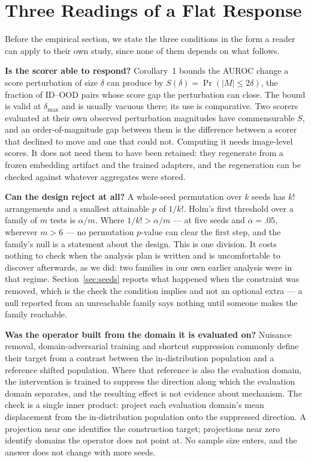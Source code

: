 \documentclass[11pt,a4paper]{article}
\begin{document}
\section{Three Readings of a Flat Response}
\label{sec:three}
Before the empirical section, we state the three conditions in the form a
reader can apply to their own study, since none of them depends on what
follows.

\textbf{Is the scorer able to respond?} Corollary~1 bounds the AUROC change a
score perturbation of size $\delta$ can produce by $S(\delta)=\Pr(|M|\le
2\delta)$, the fraction of ID--OOD pairs whose score gap the perturbation can
close. The bound is valid at $\delta_{\max}$ and is usually vacuous there; its
use is comparative. Two scorers evaluated at their own observed perturbation
magnitudes have commensurable $S$, and an order-of-magnitude gap between them
is the difference between a scorer that declined to move and one that could not.
Computing it needs image-level scores. It does not need them to have been
retained: they regenerate from a frozen embedding artifact and the trained
adapters, and the regeneration can be checked against whatever aggregates were
stored.

\textbf{Can the design reject at all?} A whole-seed permutation over $k$ seeds
has $k!$ arrangements and a smallest attainable $p$ of $1/k!$. Holm's first
threshold over a family of $m$ tests is $\alpha/m$. Where $1/k! > \alpha/m$ ---
at five seeds and $\alpha=.05$, wherever $m>6$ --- no permutation $p$-value can
clear the first step, and the family's null is a statement about the design.
This is one division. It costs nothing to check when the analysis plan is
written and is uncomfortable to discover afterwards, as we did: two families in
our own earlier analysis were in that regime. Section~\ref{sec:seeds} reports
what happened when the constraint was removed, which is the check the condition
implies and not an optional extra --- a null reported from an unreachable
family says nothing until someone makes the family reachable.

\textbf{Was the operator built from the domain it is evaluated on?} Nuisance
removal, domain-adversarial training and shortcut suppression commonly define
their target from a contrast between the in-distribution population and a
reference shifted population. Where that reference is also the evaluation
domain, the intervention is trained to suppress the direction along which the
evaluation domain separates, and the resulting effect is not evidence about
mechanism. The check is a single inner product: project each evaluation
domain's mean displacement from the in-distribution population onto the
suppressed direction. A projection near one identifies the construction target;
projections near zero identify domains the operator does not point at. No
sample size enters, and the answer does not change with more seeds.
\end{document}
